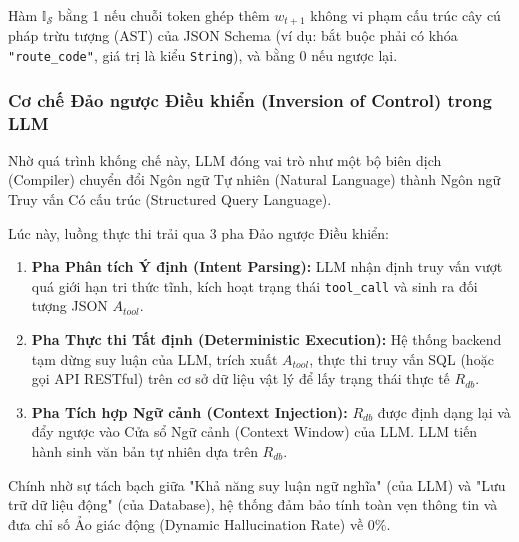 Hàm $\mathbb{I}_{\mathcal{S}}$ bằng 1 nếu chuỗi token ghép thêm $w_{t+1}$ không vi phạm cấu trúc cây cú pháp trừu tượng (AST) của JSON Schema (ví dụ: bắt buộc phải có khóa \texttt{"route\_code"}, giá trị là kiểu \texttt{String}), và bằng 0 nếu ngược lại.

\subsubsection{Cơ chế Đảo ngược Điều khiển (Inversion of Control) trong LLM}
Nhờ quá trình khống chế này, LLM đóng vai trò như một bộ biên dịch (Compiler) chuyển đổi Ngôn ngữ Tự nhiên (Natural Language) thành Ngôn ngữ Truy vấn Có cấu trúc (Structured Query Language). 

Lúc này, luồng thực thi trải qua 3 pha Đảo ngược Điều khiển:
\begin{enumerate}
    \item \textbf{Pha Phân tích Ý định (Intent Parsing):} LLM nhận định truy vấn vượt quá giới hạn tri thức tĩnh, kích hoạt trạng thái \texttt{tool\_call} và sinh ra đối tượng JSON $A_{tool}$.
    \item \textbf{Pha Thực thi Tất định (Deterministic Execution):} Hệ thống backend tạm dừng suy luận của LLM, trích xuất $A_{tool}$, thực thi truy vấn SQL (hoặc gọi API RESTful) trên cơ sở dữ liệu vật lý để lấy trạng thái thực tế $R_{db}$.
    \item \textbf{Pha Tích hợp Ngữ cảnh (Context Injection):} $R_{db}$ được định dạng lại và đẩy ngược vào Cửa sổ Ngữ cảnh (Context Window) của LLM. LLM tiến hành sinh văn bản tự nhiên dựa trên $R_{db}$.
\end{enumerate}
Chính nhờ sự tách bạch giữa "Khả năng suy luận ngữ nghĩa" (của LLM) và "Lưu trữ dữ liệu động" (của Database), hệ thống đảm bảo tính toàn vẹn thông tin và đưa chỉ số Ảo giác động (Dynamic Hallucination Rate) về $0\%$.
